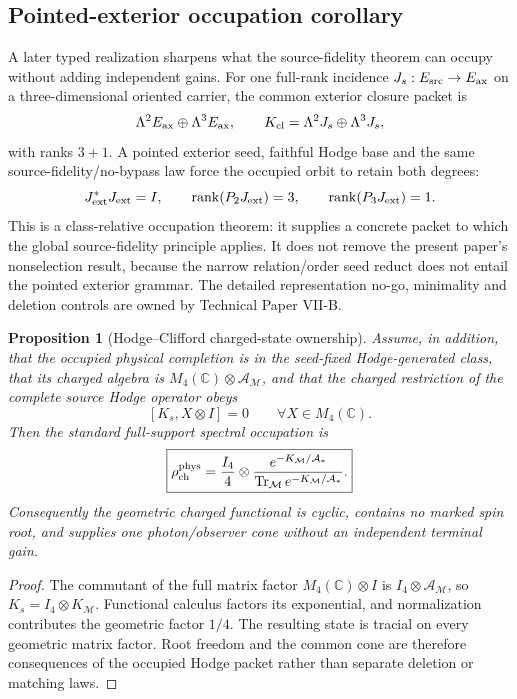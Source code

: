 \documentclass[11pt]{article}
\newtheorem{proposition}{Proposition}
\begin{document}
\subsection{Pointed-exterior occupation corollary}

A later typed realization sharpens what the source-fidelity theorem can
occupy without adding independent gains.  For one full-rank incidence
$J_s:E_{\rm src}\to E_{\rm ax}$ on a three-dimensional oriented carrier, the
common exterior closure packet is
\[
 \Lambda^2E_{\rm ax}\oplus\Lambda^3E_{\rm ax},
 \qquad
 K_{\rm cl}=\Lambda^2J_s\oplus\Lambda^3J_s,
\]
with ranks $3+1$.  A pointed exterior seed, faithful Hodge base and the same
source-fidelity/no-bypass law force the occupied orbit to retain both degrees:
\[
 J_{\rm ext}^*J_{\rm ext}=I,
 \qquad
 \operatorname{rank}(P_2J_{\rm ext})=3,
 \qquad
 \operatorname{rank}(P_3J_{\rm ext})=1.
\]
This is a class-relative occupation theorem: it supplies a concrete packet to
which the global source-fidelity principle applies.  It does not remove the
present paper's nonselection result, because the narrow relation/order seed
reduct does not entail the pointed exterior grammar.  The detailed
representation no-go, minimality and deletion controls are owned by Technical
Paper VII-B.

\begin{proposition}[Hodge--Clifford charged-state ownership]
Assume, in addition, that the occupied physical completion is in the
seed-fixed Hodge-generated class, that its charged algebra is
\(M_4(\mathbb C)\otimes\mathcal A_{\mathcal M}\), and that the charged
restriction of the complete source Hodge operator obeys
\[
 [K_s,X\otimes I]=0\qquad\forall X\in M_4(\mathbb C).
\]
Then the standard full-support spectral occupation is
\[
 \boxed{\rho_{\rm ch}^{\rm phys}
 =\frac{I_4}{4}\otimes
 \frac{e^{-K_{\mathcal M}/\mathcal A_*}}
 {\operatorname{Tr}_{\mathcal M}e^{-K_{\mathcal M}/\mathcal A_*}}.}
 \label{eq:hodge-clifford-root-free-state}
\]
Consequently the geometric charged functional is cyclic, contains no marked
spin root, and supplies one photon/observer cone without an independent
terminal gain.
\end{proposition}

\begin{proof}
The commutant of the full matrix factor
\(M_4(\mathbb C)\otimes I\) is
\(I_4\otimes\mathcal A_{\mathcal M}\), so
\(K_s=I_4\otimes K_{\mathcal M}\).  Functional calculus factors its
exponential, and normalization contributes the geometric factor \(1/4\).
The resulting state is tracial on every geometric matrix factor.  Root
freedom and the common cone are therefore consequences of the occupied Hodge
packet rather than separate deletion or matching laws.
\end{proof}
\end{document}
